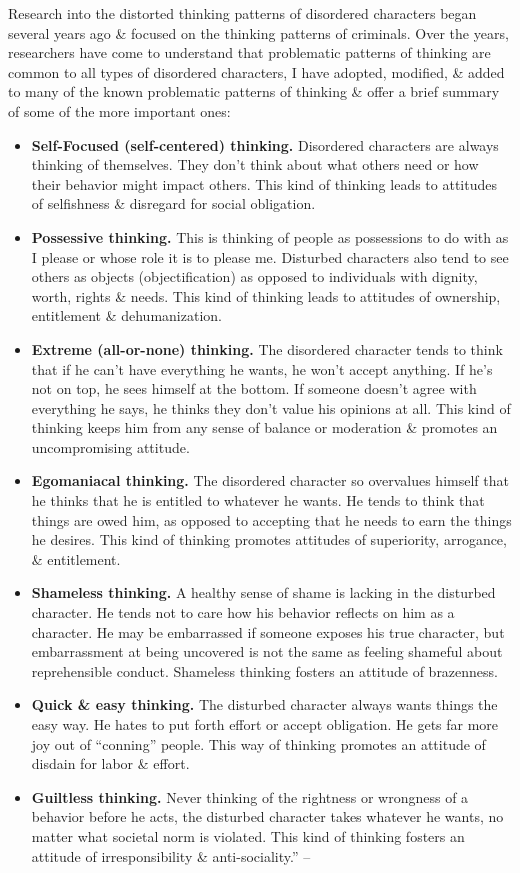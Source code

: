 \documentclass{article}
\numberwithin{equation}{section}
\begin{document}
Research into the distorted thinking patterns of disordered characters began several years ago \& focused on the thinking patterns of criminals. Over the years, researchers have come to understand that problematic patterns of thinking are common to all types of disordered characters, I have adopted, modified, \& added to many of the known problematic patterns of thinking \& offer a brief summary of some of the more important ones:
\begin{itemize}
	\item \textbf{Self-Focused (self-centered) thinking.} Disordered characters are always thinking of themselves. They don't think about what others need or how their behavior might impact others. This kind of thinking leads to attitudes of selfishness \& disregard for social obligation.
	\item \textbf{Possessive thinking.} This is thinking of people as possessions to do with as I please or whose role it is to please me. Disturbed characters also tend to see others as objects (objectification) as opposed to individuals with dignity, worth, rights \& needs. This kind of thinking leads to attitudes of ownership, entitlement \& dehumanization.
	\item \textbf{Extreme (all-or-none) thinking.} The disordered character tends to think that if he can't have everything he wants, he won't accept anything. If he's not on top, he sees himself at the bottom. If someone doesn't agree with everything he says, he thinks they don't value his opinions at all. This kind of thinking keeps him from any sense of balance or moderation \& promotes an uncompromising attitude.
	\item \textbf{Egomaniacal thinking.} The disordered character so overvalues himself that he thinks that he is entitled to whatever he wants. He tends to think that things are owed him, as opposed to accepting that he needs to earn the things he desires. This kind of thinking promotes attitudes of superiority, arrogance, \& entitlement.
	\item \textbf{Shameless thinking.} A healthy sense of shame is lacking in the disturbed character. He tends not to care how his behavior reflects on him as a character. He may be embarrassed if someone exposes his true character, but embarrassment at being uncovered is not the same as feeling shameful about reprehensible conduct. Shameless thinking fosters an attitude of brazenness.
	\item \textbf{Quick \& easy thinking.} The disturbed character always wants things the easy way. He hates to put forth effort or accept obligation. He gets far more joy out of ``conning'' people. This way of thinking promotes an attitude of disdain for labor \& effort.
	\item \textbf{Guiltless thinking.} Never thinking of the rightness or wrongness of a behavior before he acts, the disturbed character takes whatever he wants, no matter what societal norm is violated. This kind of thinking fosters an attitude of irresponsibility \& anti-sociality.'' -- \cite[pp. 32--34]{Simon2010}
\end{itemize}
\end{document}
